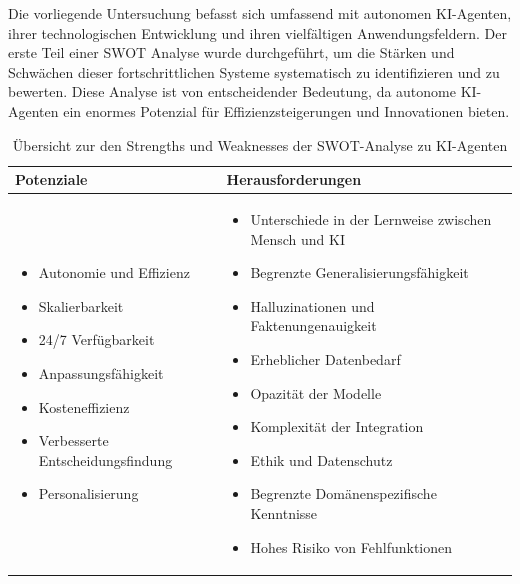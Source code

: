 \documentclass[conference]{IEEEtran}
\begin{document}
Die vorliegende Untersuchung befasst sich umfassend mit autonomen KI-Agenten, ihrer technologischen Entwicklung und ihren vielfältigen Anwendungsfeldern. Der erste Teil einer SWOT Analyse wurde durchgeführt, um die Stärken und Schwächen dieser fortschrittlichen Systeme systematisch zu identifizieren und zu bewerten. Diese Analyse ist von entscheidender Bedeutung, da autonome KI-Agenten ein enormes Potenzial für Effizienzsteigerungen und Innovationen bieten.
\begin{table}[h!]
    \centering
    \begin{tabularx}{\textwidth}{|>{\raggedright\arraybackslash}X|>{\raggedright\arraybackslash}X|} \hline 
        \textbf{Potenziale} &
        \textbf{Herausforderungen} \\ \hline
        \begin{itemize}
            \item Autonomie und Effizienz
            \item Skalierbarkeit
            \item 24/7 Verfügbarkeit
            \item Anpassungsfähigkeit
            \item Kosteneffizienz
            \item Verbesserte Entscheidungsfindung
            \item Personalisierung
        \end{itemize} &
        \begin{itemize}
            \item Unterschiede in der Lernweise zwischen Mensch und KI
            \item Begrenzte Generalisierungsfähigkeit
            \item Halluzinationen und Faktenungenauigkeit
            \item Erheblicher Datenbedarf
            \item Opazität der Modelle
            \item Komplexität der Integration
            \item Ethik und Datenschutz
            \item Begrenzte Domänenspezifische Kenntnisse
            \item Hohes Risiko von Fehlfunktionen
        \end{itemize} \\ \hline
    \end{tabularx}
    \caption{Übersicht zur den Strengths und Weaknesses der SWOT-Analyse zu KI-Agenten}
\end{table}
\end{document}
